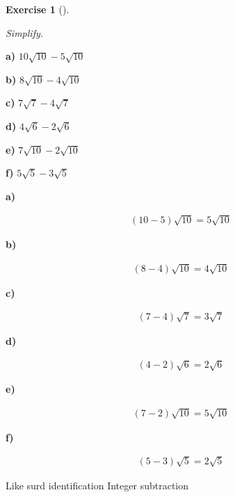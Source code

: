 \documentclass[
  letterpaper,
  DIV=11,
  numbers=noendperiod]{scrreprt}
\theoremstyle{definition}
\newtheorem{exercise}{Exercise}[chapter]
\theoremstyle{remark}
\begin{document}
\begin{exercise}[]\protect\hypertarget{exr-u2-32}{}\label{exr-u2-32}

\emph{Simplify.}

\textbf{a)} \(\displaystyle 10\sqrt{10} - 5\sqrt{10}\)

\textbf{b)} \(\displaystyle 8\sqrt{10} - 4\sqrt{10}\)

\textbf{c)} \(\displaystyle 7\sqrt{7} - 4\sqrt{7}\)

\textbf{d)} \(\displaystyle 4\sqrt{6} - 2\sqrt{6}\)

\textbf{e)} \(\displaystyle 7\sqrt{10} - 2\sqrt{10}\)

\textbf{f)} \(\displaystyle 5\sqrt{5} - 3\sqrt{5}\)

\begin{tcolorbox}[enhanced jigsaw, opacitybacktitle=0.6, coltitle=black, arc=.35mm, colframe=quarto-callout-tip-color-frame, colback=white, bottomrule=.15mm, left=2mm, colbacktitle=quarto-callout-tip-color!10!white, titlerule=0mm, opacityback=0, title=\textcolor{quarto-callout-tip-color}{\faLightbulb}\hspace{0.5em}{🔍 View Solutions}, leftrule=.75mm, breakable, rightrule=.15mm, bottomtitle=1mm, toptitle=1mm, toprule=.15mm]

\textbf{a)}

\[
\begin{aligned}
(10-5)\sqrt{10}=5\sqrt{10}
\end{aligned}
\]

\textbf{b)}

\[
\begin{aligned}
(8-4)\sqrt{10}=4\sqrt{10}
\end{aligned}
\]

\textbf{c)}

\[
\begin{aligned}
(7-4)\sqrt{7}=3\sqrt{7}
\end{aligned}
\]

\textbf{d)}

\[
\begin{aligned}
(4-2)\sqrt{6}=2\sqrt{6}
\end{aligned}
\]

\textbf{e)}

\[
\begin{aligned}
(7-2)\sqrt{10}=5\sqrt{10}
\end{aligned}
\]

\textbf{f)}

\[
\begin{aligned}
(5-3)\sqrt{5}=2\sqrt{5}
\end{aligned}
\]

\end{tcolorbox}

{Like surd identification} {Integer subtraction}

\end{exercise}
\end{document}
